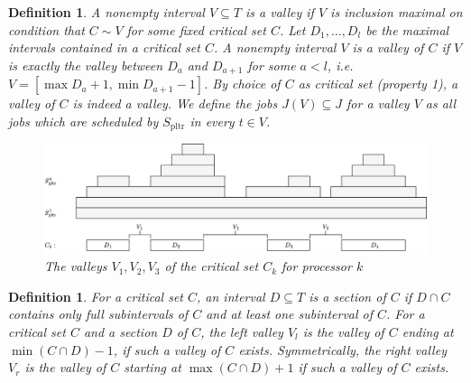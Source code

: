 \documentclass[a4paper]{article}
\DeclareMathOperator{\pltr}{pltr}
\DeclareMathOperator{\crit}{crit}
\newtheorem{definition}[theorem]{Definition}
\begin{document}
\begin{definition}
A nonempty interval $V \subseteq T$ is a \emph{valley} if $V$ is inclusion maximal on condition that $C \sim V$ for some fixed critical set $C$.
Let $D_1, \ldots, D_l$ be the maximal intervals contained in a critical set $C$.
A nonempty interval $V$ is a \emph{valley of $C$} if $V$ is exactly the valley between $D_{a}$ and $D_{a+1}$ for some $a < l$, i.e. $V = [\max D_a + 1, \min D_{a+1} - 1]$.
By choice of $C$ as critical set (property 1), a valley of $C$ is indeed a valley.
We define the jobs $J(V) \subseteq J$ for a valley $V$ as all jobs which are scheduled by $S_{\pltr}$ in every $t \in V$.
\begin{figure}[H]
  \centering
  \includegraphics[width=1\textwidth]{graphics/valleys_of.jpg}
  \caption{The valleys $V_1, V_2, V_3$ of the critical set $C_k$ for processor $k$}\label{fig:valleys_of}
\end{figure}
\end{definition}
\begin{definition}
  For a critical set $C$, an interval $D \subseteq T$ \emph{is a section of} $C$ if $D \cap C$ contains only full subintervals of $C$ and at least one subinterval of $C$.
  For a critical set $C$ and a section $D$ of $C$, the \emph{left valley} $V_l$ is the valley of $C$ ending at $\min (C \cap D) - 1$, if such a valley of $C$ exists.
  Symmetrically, the \emph{right valley} $V_r$ is the valley of $C$ starting at $\max (C \cap D) + 1$ if such a valley of $C$ exists.
\end{definition}
\end{document}
